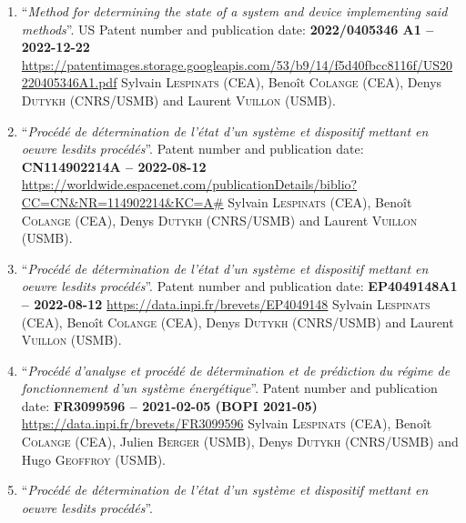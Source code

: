 \begin{enumerate}
    \item ``\textit{Method for determining the state of a system and device implementing said methods}''.\newline
        US Patent number and publication date: \textbf{2022/0405346 A1 -- 2022-12-22}\newline
        {\footnotesize \url{https://patentimages.storage.googleapis.com/53/b9/14/f5d40fbcc8116f/US20220405346A1.pdf}}\newline
        Sylvain \textsc{Lespinats} (CEA), Beno\^it \textsc{Colange} (CEA), Denys \textsc{Dutykh} (CNRS/USMB) and Laurent \textsc{Vuillon} (USMB).
    \item ``\textit{Proc\'ed\'e de d\'etermination de l'\'etat d'un syst\`eme et dispositif mettant en oeuvre lesdits proc\'ed\'es}''.\newline
        Patent number and publication date: \textbf{CN114902214A -- 2022-08-12}\newline
        {\small \url{https://worldwide.espacenet.com/publicationDetails/biblio?CC=CN&NR=114902214&KC=A#}}\newline
        Sylvain \textsc{Lespinats} (CEA), Beno\^it \textsc{Colange} (CEA), Denys \textsc{Dutykh} (CNRS/USMB) and Laurent \textsc{Vuillon} (USMB).\newpage
    \item ``\textit{Proc\'ed\'e de d\'etermination de l'\'etat d'un syst\`eme et dispositif mettant en oeuvre lesdits proc\'ed\'es}''.\newline
        Patent number and publication date: \textbf{EP4049148A1 -- 2022-08-12}\newline
        \url{https://data.inpi.fr/brevets/EP4049148}\newline
        Sylvain \textsc{Lespinats} (CEA), Beno\^it \textsc{Colange} (CEA), Denys \textsc{Dutykh} (CNRS/USMB) and Laurent \textsc{Vuillon} (USMB).
    \item ``\textit{Proc\'ed\'e d'analyse et proc\'ed\'e de d\'etermination et de pr\'ediction du r\'egime de fonctionnement d'un syst\`eme \'energ\'etique}''.\newline
        Patent number and publication date: \textbf{FR3099596 -- 2021-02-05 (BOPI 2021-05)}\newline
        \url{https://data.inpi.fr/brevets/FR3099596}\newline
        Sylvain \textsc{Lespinats} (CEA), Beno\^it \textsc{Colange} (CEA), Julien \textsc{Berger} (USMB), Denys \textsc{Dutykh} (CNRS/USMB) and Hugo \textsc{Geoffroy} (USMB).
    \item ``\textit{Proc\'ed\'e de d\'etermination de l'\'etat d'un syst\`eme et dispositif mettant en oeuvre lesdits proc\'ed\'es}''.\newline

\end{enumerate}
